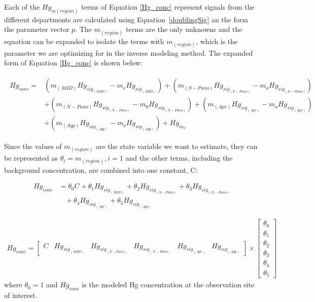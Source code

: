 \begin{flushleft}
Each of the $Hg_{m(region)}$ terms of Equation \ref{Hg_conc} represent signals from the different departments are calculated using Equation~\ref{doublingSig} an the form the parameter vector $p$. The $m_{(region)}$ terms are the only unknowns and the equation can be expanded to isolate the terms with $m_{(region)}$, which is the parameter we are optimizing for in the inverse modeling method. The expanded form of Equation \ref{Hg_conc} is shown below:

\begin{align}
\begin{split}\label{Hg_cons_expanded_form}
Hg_{conc}={}& (m_{(MdD)}Hg_{sig_{(MdD)}} -m_oHg_{sig_{(MdD)}})+ (m_{(S-Puno)}Hg_{sig_{(S-Puno)}} -m_oHg_{sig_{(S-Puno)}}) \\
            &+ (m_{(N-Puno)}Hg_{sig_{(N-Puno)}} -m_0Hg_{sig_{(N-Puno)}}) + (m_{(Apr)}Hg_{sig_{(Apr)}} -m_oHg_{sig_{(Apr)}}) \\
            &+ (m_{(Aqp)}Hg_{sig_{(Aqp)}} -m_oHg_{sig_{(Aqp)}})+Hg_{m_0}
\end{split}
\end{align}

Since the values of $m_{(region)}$ are the state variable we want to estimate, they can be represented as $\theta_i=m_{(region)}, i=1$ and the other terms, including the background concentration, are combined into one constant, C:

\begin{equation}
\begin{aligned}
    Hg_{conc}  & = \theta_0C  + \theta_1Hg_{sig_{(MdD)}}+ \theta_2Hg_{sig_{(S-Puno)}} +  \theta_3Hg_{sig_{(N-Puno)}} \\
                & \ \ \ \  +\theta_4Hg_{sig_{(Apr)}} +  \theta_5Hg_{sig_{(Aqp)}}
\end{aligned}
\end{equation}

\begin{align}
Hg_{conc} =\begin{bmatrix} C & Hg_{sig_{(MdD)}} & Hg_{sig_{(S-Puno)}} &Hg_{sig_{(N-Puno)}} &Hg_{sig_{(Apr)}} &Hg_{sig_{(Aqp)}}\end{bmatrix} \times 
            \begin{bmatrix} \theta_0 \\ \theta_1 \\ \theta_2\\ \theta_3\\ \theta_4\\ \theta_5  \end{bmatrix}
\end{align}
where $\theta_0=1$ and $Hg_{conc}$ is the modeled Hg concentration at the observation site of interest.
\end{flushleft}


